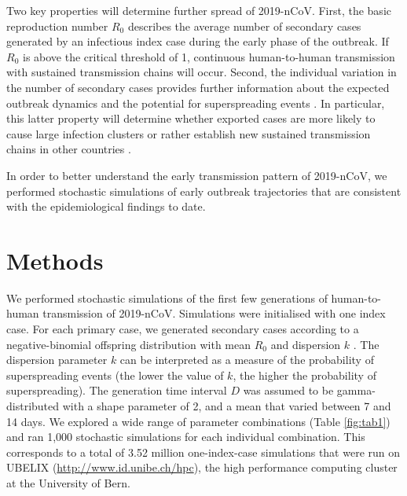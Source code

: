 \documentclass{article}
\begin{document}
Two key properties will determine further spread of 2019-nCoV. First, the basic reproduction number $R_0$ describes the average number of secondary cases generated by an infectious index case during the early phase of the outbreak. If $R_0$ is above the critical threshold of 1, continuous human-to-human transmission with sustained transmission chains will occur. Second, the individual variation in the number of secondary cases provides further information about the expected outbreak dynamics and the potential for superspreading events \cite{Lloyd-Smith:2005,Althaus:2015b,Kucharski:2015b}. In particular, this latter property will determine whether exported cases are more likely to cause large infection clusters or rather establish new sustained transmission chains in other countries \cite{Lloyd-Smith:2005}.

In order to better understand the early transmission pattern of 2019-nCoV, we performed stochastic simulations of early outbreak trajectories that are consistent with the epidemiological findings to date.
%
%
%
%

\section*{Methods}
We performed stochastic simulations of the first few generations of human-to-human transmission of 2019-nCoV. 
Simulations were initialised with one index case.
For each primary case, we generated secondary cases according to a negative-binomial offspring distribution with mean $R_0$ and dispersion $k$ \cite{Lloyd-Smith:2005,Althaus:2015b}.
The dispersion parameter $k$ can be interpreted as a measure of the probability of superspreading events (the lower the value of $k$, the higher the probability of superspreading).
The generation time interval $D$ was assumed to be gamma-distributed with a shape parameter of 2, and a mean that varied between 7 and 14 days.
We explored a wide range of parameter combinations (Table \ref{fig:tab1}) and ran 1,000 stochastic simulations for each individual combination. 
This corresponds to a total of 3.52 million one-index-case simulations that were run on UBELIX (\url{http://www.id.unibe.ch/hpc}), the high performance computing cluster at the University of Bern. 
\end{document}
